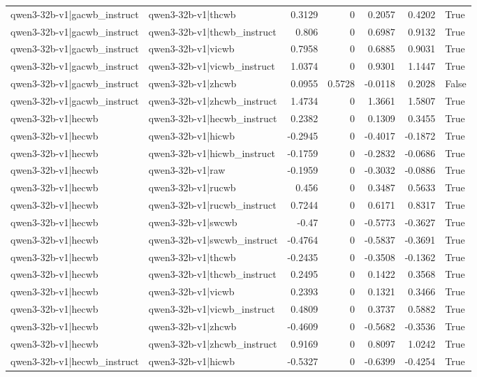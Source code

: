 \begin{table}
\begin{tabular}{l l r r r r l}
qwen3-32b-v1|gacwb_instruct & qwen3-32b-v1|thcwb & 0.3129 & 0 & 0.2057 & 0.4202 & True \\
qwen3-32b-v1|gacwb_instruct & qwen3-32b-v1|thcwb_instruct & 0.806 & 0 & 0.6987 & 0.9132 & True \\
qwen3-32b-v1|gacwb_instruct & qwen3-32b-v1|vicwb & 0.7958 & 0 & 0.6885 & 0.9031 & True \\
qwen3-32b-v1|gacwb_instruct & qwen3-32b-v1|vicwb_instruct & 1.0374 & 0 & 0.9301 & 1.1447 & True \\
qwen3-32b-v1|gacwb_instruct & qwen3-32b-v1|zhcwb & 0.0955 & 0.5728 & -0.0118 & 0.2028 & False \\
qwen3-32b-v1|gacwb_instruct & qwen3-32b-v1|zhcwb_instruct & 1.4734 & 0 & 1.3661 & 1.5807 & True \\
qwen3-32b-v1|hecwb & qwen3-32b-v1|hecwb_instruct & 0.2382 & 0 & 0.1309 & 0.3455 & True \\
qwen3-32b-v1|hecwb & qwen3-32b-v1|hicwb & -0.2945 & 0 & -0.4017 & -0.1872 & True \\
qwen3-32b-v1|hecwb & qwen3-32b-v1|hicwb_instruct & -0.1759 & 0 & -0.2832 & -0.0686 & True \\
qwen3-32b-v1|hecwb & qwen3-32b-v1|raw & -0.1959 & 0 & -0.3032 & -0.0886 & True \\
qwen3-32b-v1|hecwb & qwen3-32b-v1|rucwb & 0.456 & 0 & 0.3487 & 0.5633 & True \\
qwen3-32b-v1|hecwb & qwen3-32b-v1|rucwb_instruct & 0.7244 & 0 & 0.6171 & 0.8317 & True \\
qwen3-32b-v1|hecwb & qwen3-32b-v1|swcwb & -0.47 & 0 & -0.5773 & -0.3627 & True \\
qwen3-32b-v1|hecwb & qwen3-32b-v1|swcwb_instruct & -0.4764 & 0 & -0.5837 & -0.3691 & True \\
qwen3-32b-v1|hecwb & qwen3-32b-v1|thcwb & -0.2435 & 0 & -0.3508 & -0.1362 & True \\
qwen3-32b-v1|hecwb & qwen3-32b-v1|thcwb_instruct & 0.2495 & 0 & 0.1422 & 0.3568 & True \\
qwen3-32b-v1|hecwb & qwen3-32b-v1|vicwb & 0.2393 & 0 & 0.1321 & 0.3466 & True \\
qwen3-32b-v1|hecwb & qwen3-32b-v1|vicwb_instruct & 0.4809 & 0 & 0.3737 & 0.5882 & True \\
qwen3-32b-v1|hecwb & qwen3-32b-v1|zhcwb & -0.4609 & 0 & -0.5682 & -0.3536 & True \\
qwen3-32b-v1|hecwb & qwen3-32b-v1|zhcwb_instruct & 0.9169 & 0 & 0.8097 & 1.0242 & True \\
qwen3-32b-v1|hecwb_instruct & qwen3-32b-v1|hicwb & -0.5327 & 0 & -0.6399 & -0.4254 & True \\

\end{tabular}
\end{table}
